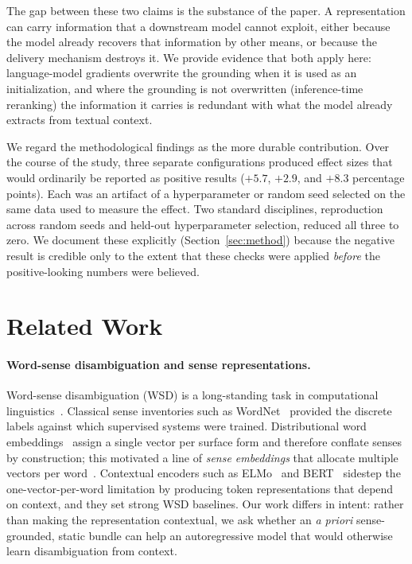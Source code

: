 \documentclass[twoside,11pt]{article}
\begin{document}
The gap between these two claims is the substance of the paper. A representation can carry information that a downstream model cannot exploit, either because the model already recovers that information by other means, or because the delivery mechanism destroys it. We provide evidence that both apply here: language-model gradients overwrite the grounding when it is used as an initialization, and where the grounding is not overwritten (inference-time reranking) the information it carries is redundant with what the model already extracts from textual context.

We regard the methodological findings as the more durable contribution. Over the course of the study, three separate configurations produced effect sizes that would ordinarily be reported as positive results ($+5.7$, $+2.9$, and $+8.3$ percentage points). Each was an artifact of a hyperparameter or random seed selected on the same data used to measure the effect. Two standard disciplines, reproduction across random seeds and held-out hyperparameter selection, reduced all three to zero. We document these explicitly (Section~\ref{sec:method}) because the negative result is credible only to the extent that these checks were applied \emph{before} the positive-looking numbers were believed.

\section{Related Work}

\paragraph{Word-sense disambiguation and sense representations.}
Word-sense disambiguation (WSD) is a long-standing task in computational linguistics~\citep{navigli2009}. Classical sense inventories such as WordNet~\citep{miller1995} provided the discrete labels against which supervised systems were trained. Distributional word embeddings~\citep{mikolov2013,pennington2014} assign a single vector per surface form and therefore conflate senses by construction; this motivated a line of \emph{sense embeddings} that allocate multiple vectors per word~\citep{reisinger2010,huang2012,neelakantan2014}. Contextual encoders such as ELMo~\citep{peters2018} and BERT~\citep{devlin2019} sidestep the one-vector-per-word limitation by producing token representations that depend on context, and they set strong WSD baselines. Our work differs in intent: rather than making the representation contextual, we ask whether an \emph{a priori} sense-grounded, static bundle can help an autoregressive model that would otherwise learn disambiguation from context.
\end{document}
